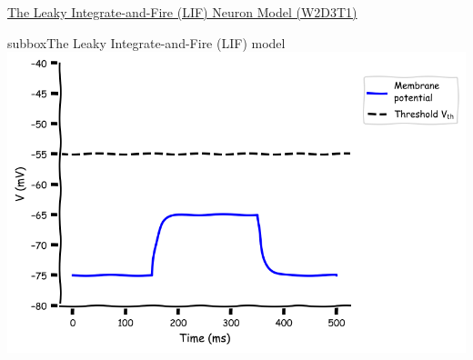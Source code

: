 \begin{textbox}{\href{https://compneuro.neuromatch.io/tutorials/W1D4_GeneralizedLinearModels/student/W1D4_Tutorial1.html}{The Leaky Integrate-and-Fire (LIF) Neuron Model (W2D3T1)} }
\begin{subbox}{subbox}{The Leaky Integrate-and-Fire (LIF) model}
\centering
\includegraphics[scale=0.15]{Figures/BNM/LIF_Figure1.png}
\end{subbox}

\end{textbox}
